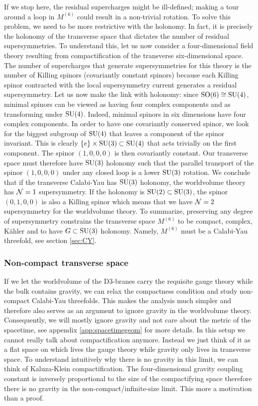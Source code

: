         If we stop here, the residual supercharges might be ill-defined; making a tour around a loop in $M^{(6)}$ could result in a non-trivial rotation. To solve this problem, we need to be more restrictive with the holonomy. In fact, it is precisely the holonomy of the transverse space that dictates the number of residual supersymmetries. To understand this, let us now consider a four-dimensional field theory resulting from compactification of the transverse six-dimensional space. The number of supercharges that generate supersymmetries for this theory is the number of Killing spinors (covariantly constant spinors) because each Killing spinor contracted with the local supersymmetry current generates a residual supersymmetry. Let us now make the link with holonomy: since $\text{SO}(6)\cong\text{SU}(4)$, minimal spinors can be viewed as having four complex components and as transforming under $\text{SU}(4)$. Indeed, minimal spinors in six dimensions have four complex components. In order to have one covariantly conserved spinor, we look for the biggest subgroup of $\text{SU}(4)$ that leaves a component of the spinor invariant. This is clearly $\{e\}\times\text{SU}(3)\subset\text{SU}(4)$ that acts trivially on the first component. The spinor $(1,0,0,0)$ is then covariantly constant. Our transverse space must therefore have $\text{SU}(3)$ holonomy such that the parallel transport of the spinor $(1,0,0,0)$ under any closed loop is a lower $\text{SU}(3)$ rotation. We conclude that if the transverse Calabi-Yau has $\text{SU}(3)$ holonomy, the worldvolume theory has $\mathcal{N}=1$ supersymmetry. If the holonomy is $\text{SU}(2)\subset\text{SU}(3)$, the spinor $(0,1,0,0)$ is also a Killing spinor which means that we have $\mathcal{N}=2$ supersymmetry for the worldvolume theory. To summarize, preserving any degree of supersymmetry constrains the transverse space $M^{(6)}$ to be compact, complex, Kähler and to have $G\subset\text{SU}(3)$ holonomy. Namely, $M^{(6)}$ must be a Calabi-Yau threefold, see section \ref{sec:CY}.

    \subsubsection*{Non-compact transverse space}
    
        If we let the worldvolume of the D$3$-branes carry the requisite gauge theory while the bulk contains gravity, we can relax the compactness condition and study non-compact Calabi-Yau threefolds. This makes the analysis much simpler and therefore also serves as an argument to ignore gravity in the worldvolume theory. Consequently, we will mostly ignore gravity and not care about the metric of the spacetime, see appendix \ref{app:spacetimegeom} for more details. In this setup we cannot really talk about compactification anymore. Instead we just think of it as a flat space on which lives the gauge theory while gravity only lives in transverse space. To understand intuitively why there is no gravity in this limit, we can think of Kaluza-Klein compactification. The four-dimensional gravity coupling constant is inversely proportional to the size of the compactifying space therefore there is no gravity in the non-compact/infinite-size limit. This more a motivation than a proof.

